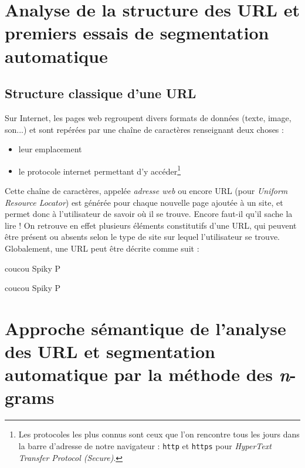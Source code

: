 \documentclass[11pt, a4paper]{article}
\begin{document}
\section{Analyse de la structure des URL et premiers essais de segmentation automatique}

\subsection{Structure classique d'une URL}

Sur Internet, les pages web regroupent divers formats de données (texte, image, son...) et sont repérées par une chaîne de caractères renseignant deux choses :
\begin{itemize}
	\item leur emplacement
	\item le protocole internet permettant d'y accéder\footnote{Les protocoles les plus connus sont ceux que l'on rencontre tous les jours dans la barre d'adresse de notre navigateur : \texttt{http} et \texttt{https} pour \textit{HyperText Transfer Protocol (Secure)}.}
\end{itemize}

Cette chaîne de caractères, appelée \textit{adresse web} ou encore URL (pour \textit{Uniform Resource Locator}) est générée pour chaque nouvelle page ajoutée à un site, et permet donc à l'utilisateur de savoir où il se trouve. Encore faut-il qu'il sache la lire ! On retrouve en effet plusieurs éléments constitutifs d'une URL, qui peuvent être présent ou absents selon le type de site sur lequel l'utilisateur se trouve. Globalement, une URL peut être décrite comme suit :

\begin{center}
coucou Spiky P
\end{center}

coucou Spiky P

\section{Approche sémantique de l'analyse des URL et segmentation automatique par la méthode des \textit{n}-grams}



\end{document}
